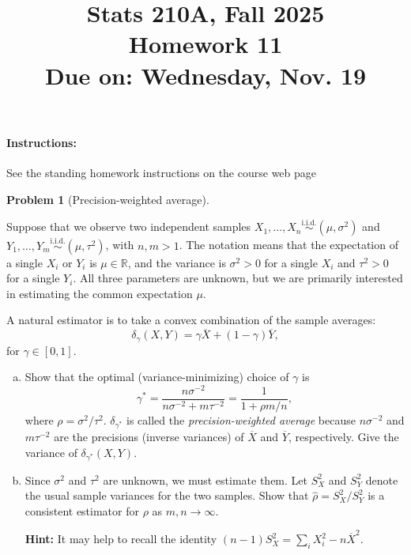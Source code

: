 \documentclass{article}
\newcommand{\RR}{\mathbb{R}}
\newcommand{\simiid}{\overset{\text{i.i.d.}}{\sim}}
\theoremstyle{definition}
\newtheorem{problem}{Problem}
\begin{document}
\title{Stats 210A, Fall 2025\\
  Homework 11 \\
  {\large {\bf Due on}: Wednesday, Nov. 19}}
\date{}

\maketitle

\paragraph{Instructions:} See the standing homework instructions on the course web page


\begin{problem}[Precision-weighted average]
\label{prob:prec-weights}

 Suppose that we observe two independent samples $X_1,\ldots,X_n\simiid (\mu, \sigma^2)$ and $Y_1,\ldots,Y_m \simiid (\mu, \tau^2)$, with $n,m> 1$. The notation means that the expectation of a single $X_i$ or $Y_i$ is $\mu\in \RR$, and the variance is $\sigma^2>0$ for a single $X_i$ and $\tau^2>0$ for a single $Y_i$. All three parameters are unknown, but we are primarily interested in estimating the common expectation $\mu$.

A natural estimator is to take a convex combination of the sample averages:
\[
\delta_\gamma(X,Y) = \gamma \overline X + (1-\gamma) \overline Y,
\]
for $\gamma \in [0,1]$.

\begin{enumerate}[(a)]

\item Show that the optimal (variance-minimizing) choice of $\gamma$ is
\[
\gamma^* = \frac{n\sigma^{-2}}{n\sigma^{-2}+m\tau^{-2}} = \frac{1}{1+\rho m/n},
\]
where $\rho = \sigma^2/\tau^2$. $\delta_{\gamma^*}$ is called the {\em precision-weighted average} because $n\sigma^{-2}$ and $m\tau^{-2}$ are the precisions (inverse variances) of $\overline{X}$ and $\overline{Y}$, respectively. Give the variance of $\delta_{\gamma^*}(X,Y)$.



\item Since $\sigma^2$ and $\tau^2$ are unknown, we must estimate them. Let $S_X^2$ and $S_Y^2$ denote the usual sample variances for the two samples. Show that $\hat\rho = S_X^2/S_Y^2$ is a consistent estimator for $\rho$ as $m,n \to \infty$.

{\bf Hint:} It may help to recall the identity $(n-1)S_X^2 = \sum_i X_i^2 - n\overline{X}^2$.


\end{enumerate}
\end{problem}
\end{document}
